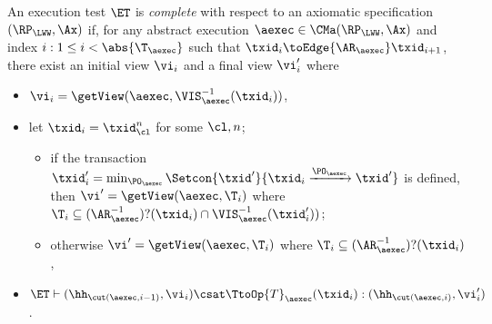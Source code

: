 \begin{definition}
\label{def:et_complete}
An execution test $\ET$ is \emph{complete} with respect 
to an axiomatic specification $(\RP_{\LWW}, \Ax)$ if, for any abstract execution $\aexec \in \CMa(\RP_{\LWW}, \Ax)$ 
and index \( i : 1 \leq i < \abs{\T_{\aexec}}\) such that \( \txid_{i} \toEdge{\AR_{\aexec}} \txid_{i+1} \), there exist an initial view $\vi_{i}$ and a final view $\vi_{i}'$ where 
\begin{itemize}
\item $\vi_{i} = \getView(\aexec, \VIS_{\aexec}^{-1}(\txid_{i}))$, 
\item let $\txid_{i} = \txid_{\cl}^{n}$ for some $\cl, n$; 
    \begin{itemize}
        \item if the transaction $\txid_{i}' = \min_{\PO_{\aexec}}\Setcon{\txid' }{ \txid_i \xrightarrow{\PO_{\aexec}} \txid'}$ is defined, then $\vi' = \getView(\aexec, \T_{i})$ where $\T_{i} \subseteq (\AR_{\aexec}^{-1})?(\txid_{i}) \cap \VIS_{\aexec}^{-1}(\txid_{i}'))$; 
        \item otherwise $\vi' = \getView(\aexec, \T_{i})$ where $\T_{i} \subseteq (\AR_{\aexec}^{-1})?(\txid_{i})$, 
    \end{itemize}
\item $\ET \vdash (\hh_{\cut(\aexec, i-1)}, \vi_{i}) \csat \TtoOp{T}_{\aexec}(\txid_{i}) : (\hh_{\cut(\aexec, i)},\vi_{i}')$.
\end{itemize}
\end{definition}

